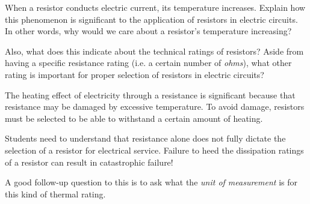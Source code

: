 

When a resistor conducts electric current, its temperature increases.  Explain how this phenomenon is significant to the application of resistors in electric circuits.  In other words, why would we care about a resistor's temperature increasing?

Also, what does this indicate about the technical ratings of resistors?  Aside from having a specific resistance rating (i.e. a certain number of {\it ohms}), what other rating is important for proper selection of resistors in electric circuits?







The heating effect of electricity through a resistance is significant because that resistance may be damaged by excessive temperature.  To avoid damage, resistors must be selected to be able to withstand a certain amount of heating.







Students need to understand that resistance alone does not fully dictate the selection of a resistor for electrical service.  Failure to heed the dissipation ratings of a resistor can result in catastrophic failure!

A good follow-up question to this is to ask what the {\it unit of measurement} is for this kind of thermal rating.




